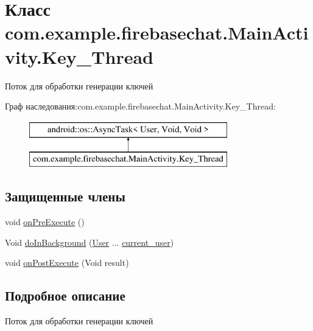 \hypertarget{classcom_1_1example_1_1firebasechat_1_1_main_activity_1_1_key___thread}{}\section{Класс com.\+example.\+firebasechat.\+Main\+Activity.\+Key\+\_\+\+Thread}
\label{classcom_1_1example_1_1firebasechat_1_1_main_activity_1_1_key___thread}


Поток для обработки генерации ключей  


Граф наследования\+:com.\+example.\+firebasechat.\+Main\+Activity.\+Key\+\_\+\+Thread\+:\begin{figure}[H]
\begin{center}
\leavevmode
\includegraphics[height=2.000000cm]{classcom_1_1example_1_1firebasechat_1_1_main_activity_1_1_key___thread}
\end{center}
\end{figure}
\subsection*{Защищенные члены}
\begin{DoxyCompactItemize}
\item 
void \mbox{\hyperlink{classcom_1_1example_1_1firebasechat_1_1_main_activity_1_1_key___thread_ab4f5d0fba51cf4688bbb5bcdec87fe57}{on\+Pre\+Execute}} ()
\item 
Void \mbox{\hyperlink{classcom_1_1example_1_1firebasechat_1_1_main_activity_1_1_key___thread_a6e944d0c77208e4ec4f8d18207d78412}{do\+In\+Background}} (\mbox{\hyperlink{classcom_1_1example_1_1firebasechat_1_1_user}{User}} ... \mbox{\hyperlink{classcom_1_1example_1_1firebasechat_1_1_main_activity_a139972aaf697b18799afeede7a832bc0}{current\+\_\+user}})
\item 
void \mbox{\hyperlink{classcom_1_1example_1_1firebasechat_1_1_main_activity_1_1_key___thread_a8b45edd36455a43fe7266f8c49adaf75}{on\+Post\+Execute}} (Void result)
\end{DoxyCompactItemize}


\subsection{Подробное описание}
Поток для обработки генерации ключей 

